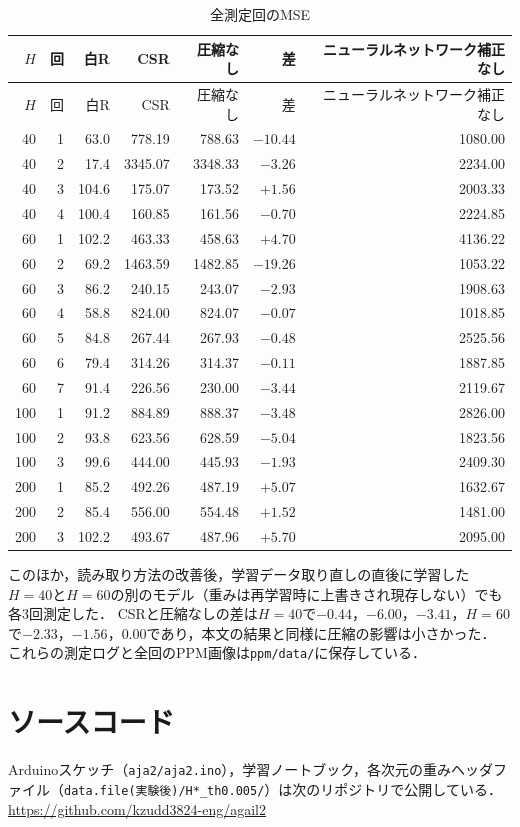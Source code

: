 \documentclass[a4paper,11pt,uplatex,dvipdfmx]{jsarticle}
\begin{document}
\begin{longtable}{rrrrrrr}
  \caption{全測定回のMSE}
  \label{tab:allruns} \\
  \toprule
  $H$ & 回 & 白R & CSR & 圧縮なし & 差 & ニューラルネットワーク補正なし \\
  \midrule
  \endfirsthead
  \toprule
  $H$ & 回 & 白R & CSR & 圧縮なし & 差 & ニューラルネットワーク補正なし \\
  \midrule
  \endhead
  40  & 1 &  63.0 &  778.19 &  788.63 & $-10.44$ & 1080.00 \\
  40  & 2 &  17.4 & 3345.07 & 3348.33 &  $-3.26$ & 2234.00 \\
  40  & 3 & 104.6 &  175.07 &  173.52 &  $+1.56$ & 2003.33 \\
  40  & 4 & 100.4 &  160.85 &  161.56 &  $-0.70$ & 2224.85 \\
  \midrule
  60  & 1 & 102.2 &  463.33 &  458.63 &  $+4.70$ & 4136.22 \\
  60  & 2 &  69.2 & 1463.59 & 1482.85 & $-19.26$ & 1053.22 \\
  60  & 3 &  86.2 &  240.15 &  243.07 &  $-2.93$ & 1908.63 \\
  60  & 4 &  58.8 &  824.00 &  824.07 &  $-0.07$ & 1018.85 \\
  60  & 5 &  84.8 &  267.44 &  267.93 &  $-0.48$ & 2525.56 \\
  60  & 6 &  79.4 &  314.26 &  314.37 &  $-0.11$ & 1887.85 \\
  60  & 7 &  91.4 &  226.56 &  230.00 &  $-3.44$ & 2119.67 \\
  \midrule
  100 & 1 &  91.2 &  884.89 &  888.37 &  $-3.48$ & 2826.00 \\
  100 & 2 &  93.8 &  623.56 &  628.59 &  $-5.04$ & 1823.56 \\
  100 & 3 &  99.6 &  444.00 &  445.93 &  $-1.93$ & 2409.30 \\
  \midrule
  200 & 1 &  85.2 &  492.26 &  487.19 &  $+5.07$ & 1632.67 \\
  200 & 2 &  85.4 &  556.00 &  554.48 &  $+1.52$ & 1481.00 \\
  200 & 3 & 102.2 &  493.67 &  487.96 &  $+5.70$ & 2095.00 \\
  \bottomrule
\end{longtable}

このほか，読み取り方法の改善後，学習データ取り直しの直後に学習した$H=40$と$H=60$の別のモデル（重みは再学習時に上書きされ現存しない）でも各3回測定した．
CSRと圧縮なしの差は$H=40$で$-0.44$，$-6.00$，$-3.41$，$H=60$で$-2.33$，$-1.56$，$0.00$であり，本文の結果と同様に圧縮の影響は小さかった．
これらの測定ログと全回のPPM画像は\texttt{ppm/data/}に保存している．

\section{ソースコード}
Arduinoスケッチ（\texttt{aja2/aja2.ino}），学習ノートブック，各次元の重みヘッダファイル（\texttt{data.file(実験後)/H*\_th0.005/}）は次のリポジトリで公開している．\\
\url{https://github.com/kzudd3824-eng/agail2}
\end{document}
